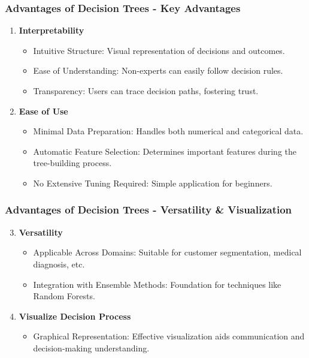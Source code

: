 \documentclass[aspectratio=169]{beamer}
\begin{document}
\begin{frame}[fragile]
    \frametitle{Advantages of Decision Trees - Key Advantages}
    \begin{enumerate}
        \item \textbf{Interpretability}
        \begin{itemize}
            \item Intuitive Structure: Visual representation of decisions and outcomes.
            \item Ease of Understanding: Non-experts can easily follow decision rules.
            \item Transparency: Users can trace decision paths, fostering trust.
        \end{itemize}
        
        \item \textbf{Ease of Use}
        \begin{itemize}
            \item Minimal Data Preparation: Handles both numerical and categorical data.
            \item Automatic Feature Selection: Determines important features during the tree-building process.
            \item No Extensive Tuning Required: Simple application for beginners.
        \end{itemize}
    \end{enumerate}
\end{frame}

\begin{frame}[fragile]
    \frametitle{Advantages of Decision Trees - Versatility & Visualization}
    \begin{enumerate}
        \setcounter{enumi}{2} %
        \item \textbf{Versatility}
        \begin{itemize}
            \item Applicable Across Domains: Suitable for customer segmentation, medical diagnosis, etc.
            \item Integration with Ensemble Methods: Foundation for techniques like Random Forests.
        \end{itemize}

        \item \textbf{Visualize Decision Process}
        \begin{itemize}
            \item Graphical Representation: Effective visualization aids communication and decision-making understanding.
        \end{itemize}
    \end{enumerate}
\end{frame}
\end{document}
